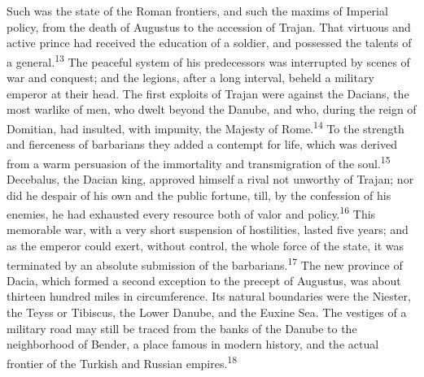

Such was the state of the Roman frontiers, and such the maxims of
Imperial policy, from the death of Augustus to the accession of
Trajan. That virtuous and active prince had received the
education of a soldier, and possessed the talents of a general.\textsuperscript{13}
The peaceful system of his predecessors was interrupted by
scenes of war and conquest; and the legions, after a long
interval, beheld a military emperor at their head. The first
exploits of Trajan were against the Dacians, the most warlike of
men, who dwelt beyond the Danube, and who, during the reign of
Domitian, had insulted, with impunity, the Majesty of Rome.\textsuperscript{14} To
the strength and fierceness of barbarians they added a contempt
for life, which was derived from a warm persuasion of the
immortality and transmigration of the soul.\textsuperscript{15} Decebalus, the
Dacian king, approved himself a rival not unworthy of Trajan; nor
did he despair of his own and the public fortune, till, by the
confession of his enemies, he had exhausted every resource both
of valor and policy.\textsuperscript{16} This memorable war, with a very short
suspension of hostilities, lasted five years; and as the emperor
could exert, without control, the whole force of the state, it
was terminated by an absolute submission of the barbarians.\textsuperscript{17}
The new province of Dacia, which formed a second exception to the
precept of Augustus, was about thirteen hundred miles in
circumference. Its natural boundaries were the Niester, the Teyss
or Tibiscus, the Lower Danube, and the Euxine Sea. The vestiges
of a military road may still be traced from the banks of the
Danube to the neighborhood of Bender, a place famous in modern
history, and the actual frontier of the Turkish and Russian
empires.\textsuperscript{18}



